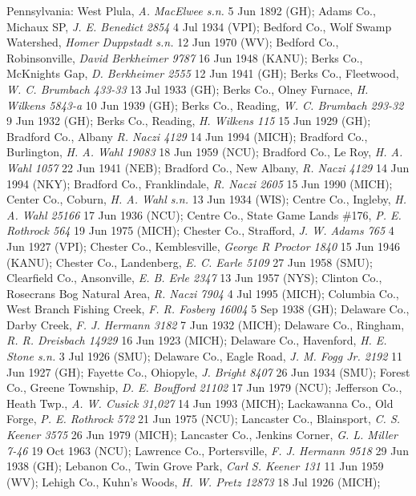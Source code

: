\documentclass{article}
\begin{document}
Pennsylvania:
West Plula, \textit{A. MacElwee s.n.} 5 Jun 1892 (GH);
Adams Co., Michaux SP, \textit{J. E. Benedict 2854} 4 Jul 1934 (VPI);
Bedford Co., Wolf Swamp Watershed, \textit{Homer Duppstadt s.n.} 12 Jun 1970 (WV);
Bedford Co., Robinsonville, \textit{David Berkheimer 9787} 16 Jun 1948 (KANU);
Berks Co., McKnights Gap, \textit{D. Berkheimer 2555} 12 Jun 1941 (GH);
Berks Co., Fleetwood, \textit{W. C. Brumbach 433-33} 13 Jul 1933 (GH);
Berks Co., Olney Furnace, \textit{H. Wilkens 5843-a} 10 Jun 1939 (GH);
Berks Co., Reading, \textit{W. C. Brumbach 293-32} 9 Jun 1932 (GH);
Berks Co., Reading, \textit{H. Wilkens 115} 15 Jun 1929 (GH);
Bradford Co., Albany \textit{R. Naczi 4129} 14 Jun 1994 (MICH);
Bradford Co., Burlington, \textit{H. A. Wahl 19083} 18 Jun 1959 (NCU);
Bradford Co., Le Roy, \textit{H. A. Wahl 1057} 22 Jun 1941 (NEB);
Bradford Co., New Albany, \textit{R. Naczi 4129} 14 Jun 1994 (NKY);
Bradford Co., Franklindale, \textit{R. Naczi 2605} 15 Jun 1990 (MICH);
Center Co., Coburn, \textit{H. A. Wahl s.n.} 13 Jun 1934 (WIS);
Centre Co., Ingleby, \textit{H. A. Wahl 25166} 17 Jun 1936 (NCU);
Centre Co., State Game Lands \#176, \textit{P. E. Rothrock 564} 19 Jun 1975 (MICH);
Chester Co., Strafford, \textit{J. W. Adams 765} 4 Jun 1927 (VPI);
Chester Co., Kemblesville, \textit{George R Proctor 1840} 15 Jun 1946 (KANU);
Chester Co., Landenberg, \textit{E. C. Earle 5109} 27 Jun 1958 (SMU);
Clearfield Co., Ansonville, \textit{E. B. Erle 2347} 13 Jun 1957 (NYS);
Clinton Co., Rosecrans Bog Natural Area, \textit{R. Naczi 7904} 4 Jul 1995 (MICH);
Columbia Co., West Branch Fishing Creek, \textit{F. R. Fosberg 16004} 5 Sep 1938 (GH);
Delaware Co., Darby Creek, \textit{F. J. Hermann 3182} 7 Jun 1932 (MICH);
Delaware Co., Ringham, \textit{R. R. Dreisbach 14929} 16 Jun 1923 (MICH);
Delaware Co., Havenford, \textit{H. E. Stone s.n.} 3 Jul 1926 (SMU);
Delaware Co., Eagle Road, \textit{J. M. Fogg Jr. 2192} 11 Jun 1927 (GH);
Fayette Co., Ohiopyle, \textit{J. Bright 8407} 26 Jun 1934 (SMU);
Forest Co., Greene Township, \textit{D. E. Boufford 21102} 17 Jun 1979 (NCU);
Jefferson Co., Heath Twp., \textit{A. W. Cusick 31,027} 14 Jun 1993 (MICH);
Lackawanna Co., Old Forge, \textit{P. E. Rothrock 572} 21 Jun 1975 (NCU);
Lancaster Co., Blainsport, \textit{C. S. Keener 3575} 26 Jun 1979 (MICH);
Lancaster Co., Jenkins Corner, \textit{G. L. Miller 7-46} 19 Oct 1963 (NCU);
Lawrence Co., Portersville, \textit{F. J. Hermann 9518} 29 Jun 1938 (GH);
Lebanon Co., Twin Grove Park, \textit{Carl S. Keener 131} 11 Jun 1959 (WV);
Lehigh Co., Kuhn's Woods, \textit{H. W. Pretz 12873} 18 Jul 1926 (MICH);
\end{document}
